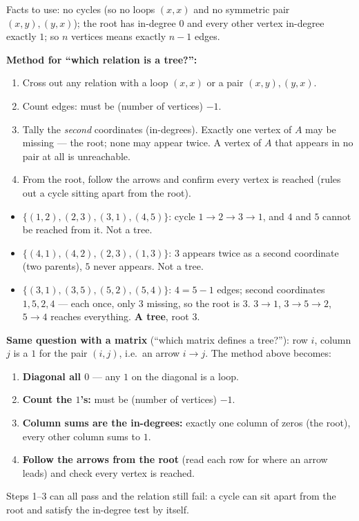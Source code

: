 \documentclass{fkt-notes}
\theoremstyle{definition}
\begin{document}
Facts to use: no cycles (so no loops $(x,x)$ and no symmetric pair $(x,y),(y,x)$); the root has in-degree $0$ and every other vertex in-degree exactly $1$; so $n$ vertices means exactly $n-1$ edges.

\textbf{Method for ``which relation is a tree?'':}
%
\begin{enumerate}[nosep]
  \item Cross out any relation with a loop $(x,x)$ or a pair $(x,y),
          (y,x)$.
  \item Count edges: must be (number of vertices) $- 1$.
  \item Tally the \emph{second} coordinates (in-degrees). Exactly one
        vertex of $A$ may be missing --- the root; none may appear twice.
        A vertex of $A$ that appears in no pair at all is unreachable.
  \item From the root, follow the arrows and confirm every vertex is
        reached (rules out a cycle sitting apart from the root).
\end{enumerate}

\begin{example}[On $A = \{1,2,3,4,5\}$: tree or not?]
  \begin{itemize}[nosep]
    \item $\{(1,2), (2,3), (3,1), (4,5)\}$: cycle $1 \to 2 \to 3 \to 1$,
          and $4$ and $5$ cannot be reached from it. Not a tree.
    \item $\{(4,1), (4,2), (2,3), (1,3)\}$: $3$ appears twice as a second
          coordinate (two parents), $5$ never appears. Not a tree.
    \item $\{(3,1), (3,5), (5,2), (5,4)\}$: $4 = 5 - 1$ edges; second
          coordinates $1, 5, 2, 4$ --- each once, only $3$ missing, so
          the root is $3$. $3 \to 1$, $3 \to 5 \to 2$, $5 \to 4$ reaches
          everything. \textbf{A tree}, root $3$.
  \end{itemize}
\end{example}

\textbf{Same question with a matrix} (``which matrix defines a tree?''):
%
row $i$, column $j$ is a $1$ for the pair $(i,j)$, i.e.\ an arrow
$i \to j$. The method above becomes:
\begin{enumerate}[nosep]
  \item \textbf{Diagonal all $0$} --- any $1$ on the diagonal is a loop.
  \item \textbf{Count the $1$'s:} must be (number of vertices) $- 1$.
  \item \textbf{Column sums are the in-degrees:} exactly one column of
        zeros (the root), every other column sums to $1$.
  \item \textbf{Follow the arrows from the root} (read each row for
        where an arrow leads) and check every vertex is reached.
\end{enumerate}
Steps 1--3 can all pass and the relation still fail: a cycle can sit
apart from the root and satisfy the in-degree test by itself.
\end{document}
